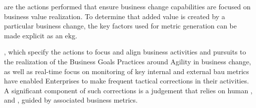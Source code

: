 %
%
 are the actions performed that ensure business change capabilities are
focused on business value realization.
To determine that added value is created by a particular business change, the key factors used for metric generation
can be made explicit as an \gls{ekg}.

, which specify the actions to focus and align
business activities and pursuits to the realization of the Business Goals Practices around Agility in
business change, as well as real-time focus on monitoring of key internal and external \gls{bau} metrics have enabled
Enterprises to make frequent tactical corrections in their activities.
A significant component of such corrections is a judgement that relies on human , 
and , guided by associated business metrics.
